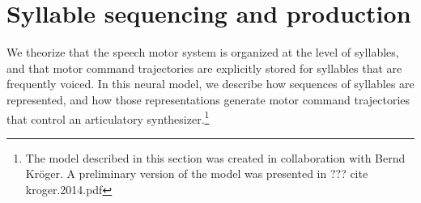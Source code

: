 



\section{Syllable sequencing and production}


We theorize that the speech motor system
is organized at the level of syllables,
and that motor command trajectories are explicitly stored
for syllables that are frequently voiced.
In this neural model,
we describe how sequences of syllables are represented,
and how those representations
generate motor command trajectories
that control an articulatory synthesizer.\footnote{
  The model described in this section was created
  in collaboration with Bernd Kr\"{o}ger.
  A preliminary version of the model was presented
  in ??? cite kroger.2014.pdf}

